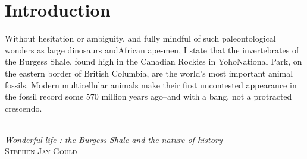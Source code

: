 \chapter{Introduction}\label{introduction}

\settowidth{\epigraphwidth}{Wonderful life : the Burgess Shale and the nature of history}
\epigraph{%
Without hesitation or ambiguity, and fully mindful of such paleontological wonders as large dinosaurs andAfrican ape-men, I state that the invertebrates of the Burgess Shale, found high in the Canadian Rockies in YohoNational Park, on the eastern border of British Columbia, are the world's most important animal fossils. Modern multicellular animals make their first uncontested appearance in the fossil record some 570 million years ago--and with a bang, not a protracted crescendo.}%
{\textit{\\Wonderful life : the Burgess Shale and the nature of history}\\\textsc{Stephen Jay Gould}}

